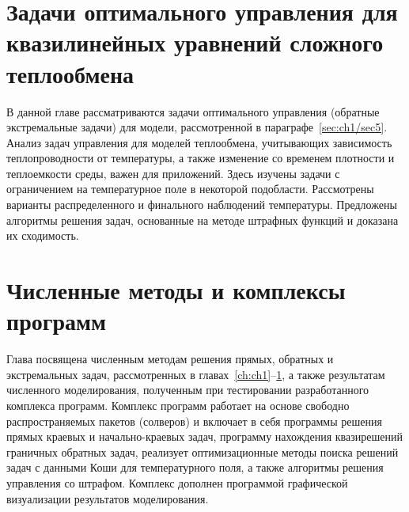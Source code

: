 \documentclass[a4paper,14pt,oneside,openany]{memoir}
\begin{document}
    \chapter{Задачи оптимального управления для квазилинейных уравнений сложного теплообмена}
    \label{ch:ch3}
    В данной главе рассматриваются задачи оптимального управления (обратные
    экстремальные задачи) для модели, рассмотренной в параграфе~\ref{sec:ch1/sec5}.
    Анализ задач управления для моделей теплообмена, учитывающих зависимость
    теплопроводности от температуры, а также изменение со временем
    плотности и теплоемкости среды, важен для приложений.
    Здесь изучены задачи с ограничением на температурное поле в некоторой подобласти.
    Рассмотрены варианты распределенного и финального наблюдений температуры.
    Предложены алгоритмы решения задач, основанные на методе
    штрафных функций и доказана их сходимость.
%    
    
    


    \chapter{Численные методы и комплексы программ}\label{ch:ch4}
    Глава посвящена численным методам решения прямых, обратных и экстремальных задач,
    рассмотренных в главах~\ref{ch:ch1}--\ref{ch:ch3}, а также результатам численного моделирования,
    полученным при тестировании разработанного комплекса программ.
    Комплекс программ работает на основе свободно
    распространяемых пакетов (солверов) и включает в себя программы
    решения прямых краевых и начально-краевых задач, программу нахождения
    квазирешений граничных обратных задач, реализует оптимизационные
    методы поиска решений задач с данными Коши для температурного поля, а %
    также алгоритмы решения управления со штрафом.
    Комплекс дополнен программой графической визуализации результатов моделирования.
    
    
    


    \setcounter{totalchapter}{\value{chapter}} %

    \appendix
    \setlength{\midchapskip}{20pt}
    \renewcommand*{\afterchapternum}{\par\nobreak\vskip \midchapskip}
    \renewcommand\thechapter{\Asbuk{chapter}} %


    \setcounter{totalappendix}{\value{chapter}} %
\end{document}
